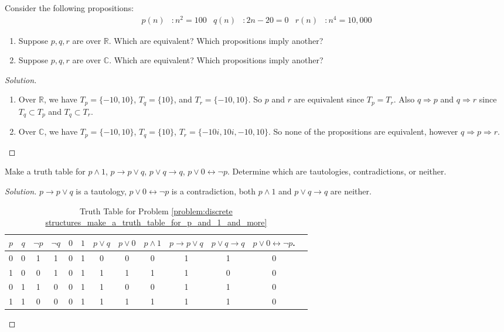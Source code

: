 \documentclass[crop=false,class=book,oneside]{standalone}
\begin{document}
\begin{problem}
Consider the following propositions:
\begin{align*}
    p(n)&:n^{2}=100 & q(n)&:2n-20=0 & r(n)&:n^{4}=10,000
\end{align*}
\begin{enumerate}
    \item Suppose $p,q,r$ are over $\mathbb{R}$. Which are equivalent? Which propositions imply another?
    \item Suppose $p,q,r$ are over $\mathbb{C}$. Which are equivalent? Which propositions imply another?
\end{enumerate}
\end{problem}
\begin{proof}[Solution]
\vspace{-\topsep}
\
\begin{enumerate}
    \item Over $\mathbb{R}$, we have $T_{p} = \{-10,10\}$, $T_{q} = \{10\}$, and $T_{r} = \{-10,10\}$. So $p$ and $r$ are equivalent since $T_{p} = T_{r}$. Also $q\Rightarrow p$ and $q\Rightarrow r$ since $T_{q} \subset T_{p}$ and $T_{q}\subset T_{r}$.
    \item Over $\mathbb{C}$, we have $T_{p} = \{-10,10\}$, $T_{q} = \{10\}$, $T_{r} = \{-10i,10i,-10,10\}$. So none of the propositions are equivalent, however $q\Rightarrow p \Rightarrow r$.
\end{enumerate}
\end{proof}
\begin{problem}
\label{problem:discrete structures_make_a_truth_table_for_p_and_1_and_more}
Make a truth table for $p\land 1$, $p\rightarrow p\lor q$, $p\lor q \rightarrow q$, $p\lor 0 \leftrightarrow \neg p$. Determine which are tautologies, contradictions, or neither.
\end{problem}
\begin{proof}[Solution]
$p\rightarrow p\lor q$ is a tautology, $p\lor 0 \leftrightarrow \neg p$ is a contradiction, both $p\land 1$ and $p\lor q \rightarrow q$ are neither. 
\begin{table}[H]
    \centering
    \captionsetup{type=table}
    \begin{tabular}{c c c c c c c c c c c c c} 
         \hline 
         $p$ & $q$ & $\neg p$ & $\neg q$ & $0$ & $1$ & $p\lor q$ & $p \lor 0$ & $p\land 1$ & $p\rightarrow p\lor q$ & $p\lor q \rightarrow q$ & $p\lor 0 \leftrightarrow \neg p$.\\ [0.5ex] 
         \hline
         0 & 0 & 1 & 1 & 0 & 1 & 0 & 0 & 0 & 1 & 1 & 0 \\
         1 & 0 & 0 & 1 & 0 & 1 & 1 & 1 & 1 & 1 & 0 & 0 \\
         0 & 1 & 1 & 0 & 0 & 1 & 1 & 0 & 0 & 1 & 1 & 0 \\
         1 & 1 & 0 & 0 & 0 & 1 & 1 & 1 & 1 & 1 & 1 & 0 \\
         \hline
    \end{tabular}
    \caption{Truth Table for Problem \ref{problem:discrete structures_make_a_truth_table_for_p_and_1_and_more}}
\end{table}
\end{proof}
\end{document}
